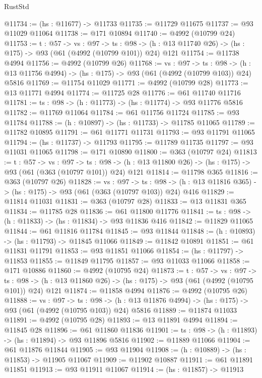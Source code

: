\begin{lexlean}{RustStd}
\begin{coremodule}
@11734 := (hs : @11677) -> @11733
@11735 := @11729 @11675
@11737 := @93 @11029 @11064
@11738 := @171 @10894
@11740 := @4992 (@10799 @24)
@11753 := {t : @57} ->
  {vs : @97} ->
  {ts : @98} -> (h : @13 @11740 @26) -> (hs : @175) -> @93 (@61 (@4992 (@10799 @101)) @24) @121
@11754 := @11738 @4994
@11756 := @4992 (@10799 @26)
@11768 := {vs : @97} ->
  {ts : @98} -> (h : @13 @11756 @4994) -> (hs : @175) -> @93 (@61 (@4992 (@10799 @103)) @24) @5816
@11769 := @11754 @11029
@11771 := @4992 (@10799 @28)
@11773 := @13 @11771 @4994
@11774 := @11725 @28
@11776 := @61 @11740 @11716
@11781 := {ts : @98} -> (h : @11773) -> (hs : @11774) -> @93 @11776 @5816
@11782 := @11769 @11064
@11784 := @61 @11756 @11724
@11785 := @93 @11784
@11788 := (h : @10897) -> (hs : @11733) -> @11785 @11065
@11789 := @11782 @10895
@11791 := @61 @11771 @11731
@11793 := @93 @11791 @11065
@11794 := (hs : @11737) -> @11793
@11795 := @11789 @11735
@11797 := @93 @11031 @11065
@11798 := @171 @10890
@11800 := @363 (@10797 @24)
@11813 := {t : @57} ->
  {vs : @97} ->
  {ts : @98} -> (h : @13 @11800 @26) -> (hs : @175) -> @93 (@61 (@363 (@10797 @101)) @24) @121
@11814 := @11798 @365
@11816 := @363 (@10797 @26)
@11828 := {vs : @97} ->
  {ts : @98} -> (h : @13 @11816 @365) -> (hs : @175) -> @93 (@61 (@363 (@10797 @103)) @24) @416
@11829 := @11814 @11031
@11831 := @363 (@10797 @28)
@11833 := @13 @11831 @365
@11834 := @11785 @28
@11836 := @61 @11800 @11776
@11841 := {ts : @98} -> (h : @11833) -> (hs : @11834) -> @93 @11836 @416
@11842 := @11829 @11065
@11844 := @61 @11816 @11784
@11845 := @93 @11844
@11848 := (h : @10893) -> (hs : @11793) -> @11845 @11066
@11849 := @11842 @10891
@11851 := @61 @11831 @11791
@11853 := @93 @11851 @11066
@11854 := (hs : @11797) -> @11853
@11855 := @11849 @11795
@11857 := @93 @11033 @11066
@11858 := @171 @10886
@11860 := @4992 (@10795 @24)
@11873 := {t : @57} ->
  {vs : @97} ->
  {ts : @98} -> (h : @13 @11860 @26) -> (hs : @175) -> @93 (@61 (@4992 (@10795 @101)) @24) @121
@11874 := @11858 @4994
@11876 := @4992 (@10795 @26)
@11888 := {vs : @97} ->
  {ts : @98} -> (h : @13 @11876 @4994) -> (hs : @175) -> @93 (@61 (@4992 (@10795 @103)) @24) @5816
@11889 := @11874 @11033
@11891 := @4992 (@10795 @28)
@11893 := @13 @11891 @4994
@11894 := @11845 @28
@11896 := @61 @11860 @11836
@11901 := {ts : @98} -> (h : @11893) -> (hs : @11894) -> @93 @11896 @5816
@11902 := @11889 @11066
@11904 := @61 @11876 @11844
@11905 := @93 @11904
@11908 := (h : @10889) -> (hs : @11853) -> @11905 @11067
@11909 := @11902 @10887
@11911 := @61 @11891 @11851
@11913 := @93 @11911 @11067
@11914 := (hs : @11857) -> @11913

\end{coremodule}
\end{lexlean}

